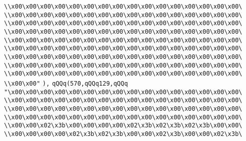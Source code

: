 \verb|\\x00\x00\x00\x00\x00\x00\x00\x00\x00\x00\x00\x00\x00\x00\x00\x00\|\newline
\verb|\\x00\x00\x00\x00\x00\x00\x00\x00\x00\x00\x00\x00\x00\x00\x00\x00\|\newline
\verb|\\x00\x00\x00\x00\x00\x00\x00\x00\x00\x00\x00\x00\x00\x00\x00\x00\|\newline
\verb|\\x00\x00\x00\x00\x00\x00\x00\x00\x00\x00\x00\x00\x00\x00\x00\x00\|\newline
\verb|\\x00\x00\x00\x00\x00\x00\x00\x00\x00\x00\x00\x00\x00\x00\x00\x00\|\newline
\verb|\\x00\x00\x00\x00\x00\x00\x00\x00\x00\x00\x00\x00\x00\x00\x00\x00\|\newline
\verb|\\x00\x00\x00\x00\x00\x00\x00\x00\x00\x00\x00\x00\x00\x00\x00\x00\|\newline
\verb|\\x00\x00\x00\x00\x00\x00\x00\x00\x00\x00\x00\x00\x00\x00\x00\x00\|\newline
\verb|\\x00\x00\x00\x00\x00\x00\x00\x00\x00\x00\x00\x00\x00\x00\x00\x00\|\newline
\verb|\\x00\x00"|\newline
\verb|),|\newline
\verb|qQQq(570,qQQq129,qQQq|\newline
\verb|"\x00\x00\x00\x00\x00\x00\x00\x00\x00\x00\x00\x00\x00\x00\x00\x00\|\newline
\verb|\\x00\x00\x00\x00\x00\x00\x00\x00\x00\x00\x00\x00\x00\x00\x00\x00\|\newline
\verb|\\x00\x00\x00\x00\x00\x00\x00\x00\x00\x00\x00\x00\x00\x00\x00\x00\|\newline
\verb|\\x00\x00\x00\x00\x00\x00\x00\x00\x00\x00\x00\x00\x00\x00\x00\x00\|\newline
\verb|\\x00\x00\x02\x3b\x00\x00\x00\x00\x02\x3b\x02\x3b\x02\x3b\x00\x00\|\newline
\verb|\\x00\x00\x00\x00\x02\x3b\x02\x3b\x00\x00\x02\x3b\x00\x00\x02\x3b\|\newline
